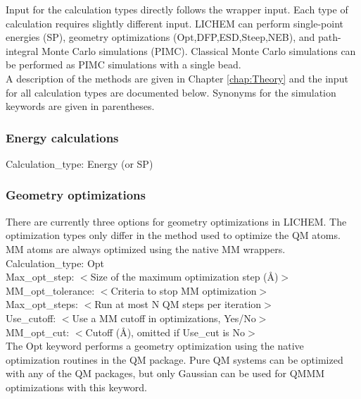 \documentclass[12pt]{report}
\begin{document}
Input for the calculation types directly follows the wrapper input.
Each type of calculation requires slightly different input.
LICHEM can perform single-point energies (SP), geometry optimizations
(Opt,DFP,ESD,Steep,NEB), and path-integral Monte Carlo simulations (PIMC).
Classical Monte Carlo simulations can be performed as PIMC simulations with a
single bead. \\

A description of the methods are given in Chapter \ref{chap:Theory} and the
input for all calculation types are documented below.
Synonyms for the simulation keywords are given in parentheses. \\

\subsubsection{Energy calculations}

Calculation\_type: Energy (or SP) \\

\subsubsection{Geometry optimizations}

There are currently three options for geometry optimizations in LICHEM.
The optimization types only differ in the method used to optimize the
QM atoms.
MM atoms are always optimized using the native MM wrappers. \\

Calculation\_type: Opt \\
Max\_opt\_step: $<$Size of the maximum optimization step (\AA)$>$ \\
MM\_opt\_tolerance: $<$Criteria to stop MM optimization$>$ \\
Max\_opt\_steps: $<$Run at most N QM steps per iteration$>$ \\
Use\_cutoff: $<$Use a MM cutoff in optimizations, Yes/No$>$ \\
MM\_opt\_cut: $<$Cutoff (\AA), omitted if Use\_cut is No$>$ \\

The Opt keyword performs a geometry optimization using the native optimization
routines in the QM package.
Pure QM systems can be optimized with any of the QM packages, but only
Gaussian can be used for QMMM optimizations with this keyword. \\
\end{document}
